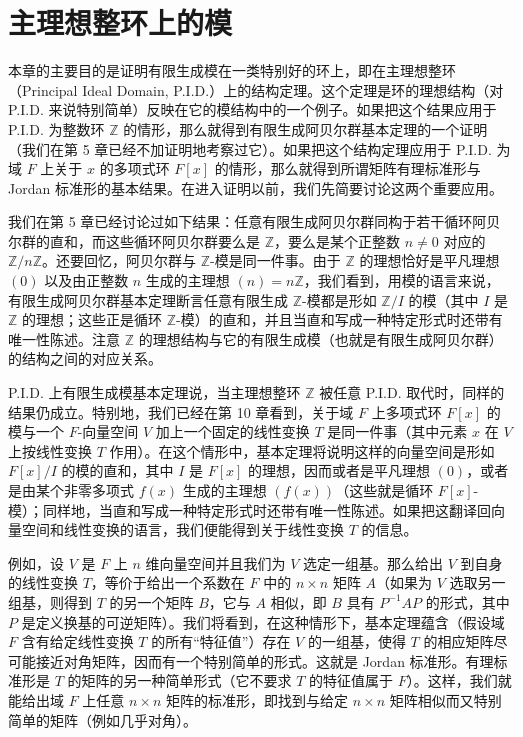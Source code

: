 

\chapter{主理想整环上的模}

本章的主要目的是证明有限生成模在一类特别好的环上，即在主理想整环（Principal Ideal Domain, P.I.D.）上的结构定理。这个定理是环的理想结构（对 P.I.D. 来说特别简单）反映在它的模结构中的一个例子。如果把这个结果应用于 P.I.D. 为整数环 $\mathbb Z$ 的情形，那么就得到有限生成阿贝尔群基本定理的一个证明（我们在第 5 章已经不加证明地考察过它）。如果把这个结构定理应用于 P.I.D. 为域 $F$ 上关于 $x$ 的多项式环 $F[x]$ 的情形，那么就得到所谓矩阵有理标准形与 Jordan 标准形的基本结果。在进入证明以前，我们先简要讨论这两个重要应用。

我们在第 5 章已经讨论过如下结果：任意有限生成阿贝尔群同构于若干循环阿贝尔群的直和，而这些循环阿贝尔群要么是 $\mathbb Z$，要么是某个正整数 $n\neq 0$ 对应的 $\mathbb Z/n\mathbb Z$。还要回忆，阿贝尔群与 $\mathbb Z$-模是同一件事。由于 $\mathbb Z$ 的理想恰好是平凡理想 $(0)$ 以及由正整数 $n$ 生成的主理想 $(n)=n\mathbb Z$，我们看到，用模的语言来说，有限生成阿贝尔群基本定理断言任意有限生成 $\mathbb Z$-模都是形如 $\mathbb Z/I$ 的模（其中 $I$ 是 $\mathbb Z$ 的理想；这些正是循环 $\mathbb Z$-模）的直和，并且当直和写成一种特定形式时还带有唯一性陈述。注意 $\mathbb Z$ 的理想结构与它的有限生成模（也就是有限生成阿贝尔群）的结构之间的对应关系。

P.I.D. 上有限生成模基本定理说，当主理想整环 $\mathbb Z$ 被任意 P.I.D. 取代时，同样的结果仍成立。特别地，我们已经在第 10 章看到，关于域 $F$ 上多项式环 $F[x]$ 的模与一个 $F$-向量空间 $V$ 加上一个固定的线性变换 $T$ 是同一件事（其中元素 $x$ 在 $V$ 上按线性变换 $T$ 作用）。在这个情形中，基本定理将说明这样的向量空间是形如 $F[x]/I$ 的模的直和，其中 $I$ 是 $F[x]$ 的理想，因而或者是平凡理想 $(0)$，或者是由某个非零多项式 $f(x)$ 生成的主理想 $(f(x))$（这些就是循环 $F[x]$-模）；同样地，当直和写成一种特定形式时还带有唯一性陈述。如果把这翻译回向量空间和线性变换的语言，我们便能得到关于线性变换 $T$ 的信息。

例如，设 $V$ 是 $F$ 上 $n$ 维向量空间并且我们为 $V$ 选定一组基。那么给出 $V$ 到自身的线性变换 $T$，等价于给出一个系数在 $F$ 中的 $n\times n$ 矩阵 $A$（如果为 $V$ 选取另一组基，则得到 $T$ 的另一个矩阵 $B$，它与 $A$ 相似，即 $B$ 具有 $P^{-1}AP$ 的形式，其中 $P$ 是定义换基的可逆矩阵）。我们将看到，在这种情形下，基本定理蕴含（假设域 $F$ 含有给定线性变换 $T$ 的所有“特征值”）存在 $V$ 的一组基，使得 $T$ 的相应矩阵尽可能接近对角矩阵，因而有一个特别简单的形式。这就是 Jordan 标准形。有理标准形是 $T$ 的矩阵的另一种简单形式（它不要求 $T$ 的特征值属于 $F$）。这样，我们就能给出域 $F$ 上任意 $n\times n$ 矩阵的标准形，即找到与给定 $n\times n$ 矩阵相似而又特别简单的矩阵（例如几乎对角）。

